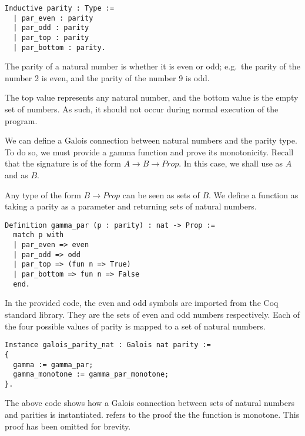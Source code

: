 \begin{listing}
\begin{verbatim}
Inductive parity : Type :=
  | par_even : parity
  | par_odd : parity
  | par_top : parity
  | par_bottom : parity.
\end{verbatim}
\end{listing}

The parity of a natural number is whether it is even or odd; e.g.\ the parity
of the number 2 is even, and the parity of the number 9 is odd.

The top value represents any natural number, and the bottom value is the empty
set of numbers. As such, it should not occur during normal execution of the 
program.

We can define a Galois connection between natural numbers and the parity type.
To do so, we must provide a gamma function and prove its monotonicity. Recall
that the signature is of the form $A \rightarrow B \rightarrow Prop$. In this
case, we shall use  as $A$ and  as $B$.

Any type of the form $B \rightarrow Prop$ can be seen as sets of $B$. We define
a function  as taking a parity as a parameter and returning
sets of natural numbers.

\begin{listing}
\begin{verbatim}
Definition gamma_par (p : parity) : nat -> Prop :=
  match p with
  | par_even => even 
  | par_odd => odd 
  | par_top => (fun n => True)
  | par_bottom => fun n => False
  end.
\end{verbatim}
\end{listing}

In the provided code, the even and odd symbols are imported from the Coq
standard library. They are the sets of even and odd numbers respectively. Each
of the four possible values of parity is mapped to a set of natural numbers.

\begin{listing}
\begin{verbatim}
Instance galois_parity_nat : Galois nat parity :=
{
  gamma := gamma_par;
  gamma_monotone := gamma_par_monotone;
}.
\end{verbatim}
\end{listing}

The above code shows how a Galois connection between sets of natural numbers 
and parities is instantiated.  refers to the proof the
the  function is monotone. This proof has been omitted for 
brevity.

